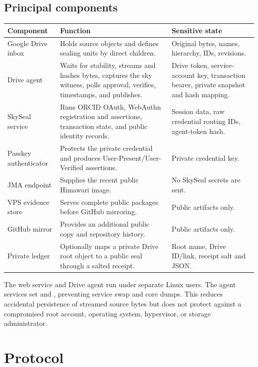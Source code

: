\documentclass[11pt,a4paper]{article}
\newcommand{\code}[1]{\texttt{\detokenize{#1}}}
\begin{document}
\subsection{Principal components}

\begin{longtable}{>{\raggedright\arraybackslash}p{}>{\raggedright\arraybackslash}p{}>{\raggedright\arraybackslash}p{}}
\toprule
Component & Function & Sensitive state \\
\midrule
\endhead
Google Drive inbox & Holds source objects and defines sealing units by direct children. & Original bytes, names, hierarchy, IDs, revisions. \\
Drive agent & Waits for stability, streams and hashes bytes, captures the sky witness, polls approval, verifies, timestamps, and publishes. & Drive token, service-account key, transaction bearer, private snapshot and hash mapping. \\
SkySeal service & Runs ORCID OAuth, WebAuthn registration and assertions, transaction state, and public identity records. & Session data, raw credential routing IDs, agent-token hash. \\
Passkey authenticator & Protects the private credential and produces User-Present/User-Verified assertions. & Private credential key. \\
JMA endpoint & Supplies the recent public Himawari image. & No SkySeal secrets are sent. \\
VPS evidence store & Serves complete public packages before GitHub mirroring. & Public artifacts only. \\
GitHub mirror & Provides an additional public copy and repository history. & Public artifacts only. \\
Private ledger & Optionally maps a private Drive root object to a public seal through a salted receipt. & Root name, Drive ID/link, receipt salt and JSON. \\
\bottomrule
\end{longtable}

The web service and Drive agent run under separate Linux users. The agent services set \code{MemorySwapMax=0} and \code{LimitCORE=0}, preventing service swap and core dumps. This reduces accidental persistence of streamed source bytes but does not protect against a compromised root account, operating system, hypervisor, or storage administrator.

\section{Protocol}
\end{document}
